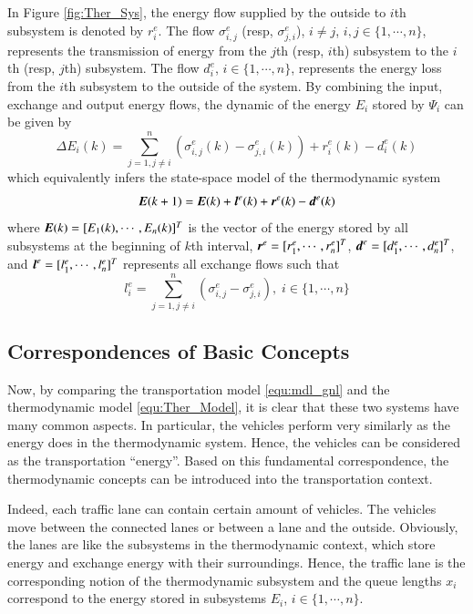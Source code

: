 \documentclass[preprint,authoryear,12pt]{elsarticle}
\renewcommand{\vec}[1]{\mbox{\boldmath$#1$}}
\begin{document}
In Figure \ref{fig:Ther_Sys}, the energy flow supplied by the outside to $i$th subsystem is denoted by $r^e_i$. The flow $\sigma^e_{i,j}$ (resp, $\sigma^e_{j,i}$), $i\neq j$, $i,j\in \{1,\cdots,n\}$, represents the transmission of energy from the $j$th (resp, $i$th) subsystem to the $i$th (resp, $j$th) subsystem. The flow $d^e_i$, $i\in \{1,\cdots,n\}$, represents the energy loss from the $i$th subsystem to the outside of the system. By combining the input, exchange and output energy flows, the dynamic of the energy $E_i$ stored by $\Psi_i$ can be given by
\begin{equation}\label{equ:Ther_Model_SubSystem}
\Delta E_i(k) = \sum_{j=1,j\neq
i}^{n}(\sigma^e_{i,j}(k)-\sigma^e_{j,i}(k))+r^e_i(k)-d^e_i(k)
\end{equation}
which equivalently infers the state-space model of the thermodynamic system
\begin{equation}\label{equ:Ther_Model}
    \vec{E}(k+1)=\vec{E}(k)+\vec{l}^e(k)+\vec{r}^e(k)-\vec{d}^e(k)
\end{equation}
where $\vec{E}(k)=[E_1(k),\cdots,E_n(k)]^T$ is the vector of the energy stored by all subsystems at the beginning of $k$th interval, $\vec{r}^e=[r^e_1,\cdots,r^e_n]^T$, $\vec{d}^e=[d^e_{1},\cdots,d^e_{n}]^T$, and $\vec{l}^e=[l^e_1,\cdots,l^e_n]^T$ represents all exchange flows such that
\begin{equation*}
l^e_i = \sum_{j=1,j\neq i}^{n}
        (\sigma^e_{i,j}-\sigma^e_{j,i}),
\; i\in \{1,\cdots,n\}
\end{equation*}

\subsection{Correspondences of Basic Concepts}

Now, by comparing the transportation model \eqref{equ:mdl_gnl} and the thermodynamic model \eqref{equ:Ther_Model}, it is clear that these two systems have many common aspects. In particular, the vehicles perform very similarly as the energy does in the thermodynamic system. Hence, the vehicles can be considered as the transportation ``energy''. Based on this fundamental correspondence, the thermodynamic concepts can be introduced into the transportation context.

Indeed, each traffic lane can contain certain amount of vehicles. The vehicles move between the connected lanes or between a lane and the outside. Obviously, the lanes are like the subsystems in the thermodynamic context, which store energy and exchange energy with their surroundings. Hence, the traffic lane is the corresponding notion of the thermodynamic subsystem and the queue lengths $x_i$ correspond to the energy stored in subsystems $E_i$, $i\in\{1,\cdots,n\}$.
\end{document}

